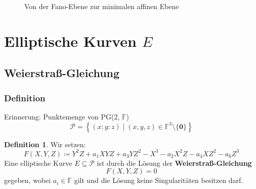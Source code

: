 \documentclass{beamer}
\theoremstyle{plain}
\theoremstyle{definition}
\newtheorem{defn}[thm]{Definition}
\theoremstyle{rem}
\newcommand{\pgtwo}{PG(2, $\mathbb{F}$)\ }
\newcommand{\ftnz}{\mathbb{F}^{3}\setminus\{\boldsymbol 0\}}
\begin{document}
\begin{frame}
\begin{figure}[H]
{{{}}
        }
        \caption{Von der Fano-Ebene zur minimalen affinen Ebene}
    \end{figure}
\end{frame}

\section{Elliptische Kurven $E$}

\subsection{Weierstraß-Gleichung}

\begin{frame}
\frametitle{Definition}
Erinnerung: Punktemenge von \pgtwo
\begin{equation*}
	\mathcal{P} = \left\{(x:y:z) \mid (x,y,z) \in \ftnz \right\}
\end{equation*}
\vspace{-6mm}
\begin{defn}
Wir setzen:
\vspace{-3mm}
\begin{equation*}
	    F(X,Y,Z)\coloneqq Y^2Z + a_1XYZ + a_3YZ^2 - X^3 - a_2X^2Z - a_4XZ^2 - a_6Z^3
\end{equation*}
Eine elliptische Kurve $E\subseteq \mathcal{P}$ ist durch die Lösung der \textbf{Weierstraß-Gleichung}
\vspace{-3mm}
\begin{equation*}
	    F(X,Y,Z)=0
\end{equation*}
        gegeben, wobei $a_i \in \mathbb{F}$ gilt und die Lösung keine Singularitäten besitzen darf.
\end{defn}
\end{frame}
\end{document}
